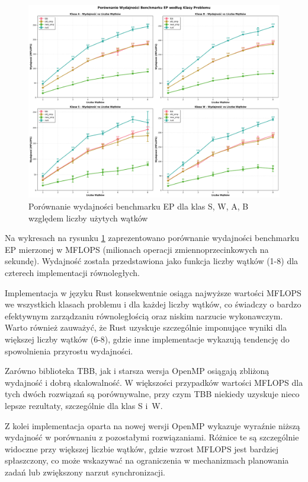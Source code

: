 \begin{figure}[H]
    \centering
    \includegraphics[width=\textwidth]{analiza/images/parallel/ep/arm/ep_porownanie_wydajnosci.png}
    \caption{Porównanie wydajności benchmarku EP dla klas S, W, A, B względem liczby użytych wątków}
    \label{ep_porownanie_wydajnosci}
\end{figure}
Na wykresach na rysunku \ref{ep_porownanie_wydajnosci} zaprezentowano porównanie wydajności benchmarku EP mierzonej w MFLOPS (milionach operacji zmiennoprzecinkowych na sekundę). Wydajność została przedstawiona jako funkcja liczby wątków (1-8) dla czterech implementacji równoległych.

Implementacja w języku Rust konsekwentnie osiąga najwyższe wartości MFLOPS we wszystkich klasach problemu i dla każdej liczby wątków, co świadczy o bardzo efektywnym zarządzaniu równoległością oraz niskim narzucie wykonawczym. Warto również zauważyć, że Rust uzyskuje szczególnie imponujące wyniki dla większej liczby wątków (6-8), gdzie inne implementacje wykazują tendencję do spowolnienia przyrostu wydajności.

Zarówno biblioteka TBB, jak i starsza wersja OpenMP osiągają zbliżoną wydajność i dobrą skalowalność. W większości przypadków wartości MFLOPS dla tych dwóch rozwiązań są porównywalne, przy czym TBB niekiedy uzyskuje nieco lepsze rezultaty, szczególnie dla klas S i~W.

Z kolei implementacja oparta na nowej wersji OpenMP wykazuje wyraźnie niższą wydajność w porównaniu z pozostałymi rozwiązaniami. Różnice te są szczególnie widoczne przy większej liczbie wątków, gdzie wzrost MFLOPS jest bardziej spłaszczony, co może wskazywać na ograniczenia w mechanizmach planowania zadań lub zwiększony narzut synchronizacji.


